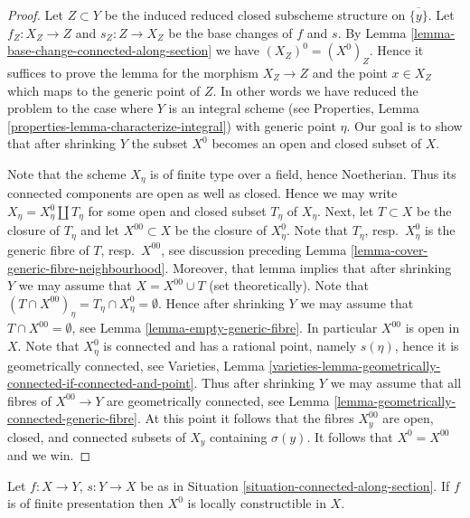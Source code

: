 \begin{proof}
Let $Z \subset Y$ be the induced reduced closed subscheme
structure on $\overline{\{y\}}$. Let $f_Z : X_Z \to Z$ and $s_Z : Z \to X_Z$
be the base changes of $f$ and $s$. By
Lemma \ref{lemma-base-change-connected-along-section}
we have $(X_Z)^0 = (X^0)_Z$. Hence it suffices to prove the lemma for
the morphism $X_Z \to Z$ and the point $x \in X_Z$ which maps to the generic
point of $Z$. In other words we have reduced the problem to the case
where $Y$ is an integral scheme (see
Properties, Lemma \ref{properties-lemma-characterize-integral})
with generic point $\eta$. Our goal is to show that after shrinking
$Y$ the subset $X^0$ becomes an open and closed subset of $X$.

\medskip\noindent
Note that the scheme $X_\eta$ is of finite type over a field, hence Noetherian.
Thus its connected components are open as well as closed. Hence we may write
$X_\eta = X_\eta^0 \coprod T_\eta$ for some open and closed subset
$T_\eta$ of $X_\eta$. Next, let $T \subset X$ be the closure of $T_\eta$
and let $X^{00} \subset X$ be the closure of $X_\eta^0$. Note that
$T_\eta$, resp.\ $X^0_\eta$ is the generic fibre of $T$, resp.\ $X^{00}$,
see discussion preceding
Lemma \ref{lemma-cover-generic-fibre-neighbourhood}.
Moreover, that lemma implies that after shrinking $Y$ we may assume that
$X = X^{00} \cup T$ (set theoretically).
Note that $(T \cap X^{00})_\eta = T_\eta \cap X^0_\eta = \emptyset$.
Hence after shrinking $Y$ we may assume that $T \cap X^{00} = \emptyset$, see
Lemma \ref{lemma-empty-generic-fibre}.
In particular $X^{00}$ is open in $X$. Note that $X^0_\eta$ is connected
and has a rational point, namely $s(\eta)$, hence it is geometrically
connected, see
Varieties,
Lemma \ref{varieties-lemma-geometrically-connected-if-connected-and-point}.
Thus after shrinking $Y$ we may assume that all fibres of $X^{00} \to Y$
are geometrically connected, see
Lemma \ref{lemma-geometrically-connected-generic-fibre}.
At this point it follows that the fibres $X^{00}_y$ are
open, closed, and connected subsets of $X_y$ containing $\sigma(y)$.
It follows that $X^0 = X^{00}$ and we win.
\end{proof}

\begin{lemma}
\label{lemma-connected-along-section-locally-constructible}
Let $f : X \to Y$, $s : Y \to X$ be as in
Situation \ref{situation-connected-along-section}.
If $f$ is of finite presentation then $X^0$ is locally constructible
in $X$.
\end{lemma}

